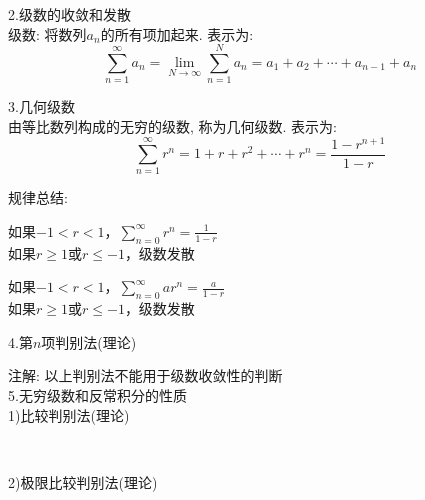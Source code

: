 2.级数的收敛和发散\\
级数: 将数列${a_n}$的所有项加起来. 表示为:
\[\sum_{n=1}^{\infty}a_n=\lim_{N\to\infty}\sum_{n=1}^Na_n=a_1+a_2+\cdots+a_{n-1}+a_n\]\vspace{4ex}

3.几何级数\\
由等比数列构成的无穷的级数, 称为几何级数. 表示为:
\[\sum_{n=1}^{\infty}r^n=1+r+r^2+\cdots+r^n=\frac{1-r^{n+1}}{1-r}\]

规律总结:
\begin{center}
\begin{boxedminipage}{6cm}
如果$-1<r<1$，$\displaystyle\sum_{n=0}^{\infty}r^n=\frac{1}{1-r}$\\
如果$r\geqslant 1$或$r\leqslant -1$，级数发散
\end{boxedminipage}
\end{center}\vspace{4ex}

\begin{center}
\begin{boxedminipage}{6cm}
如果$-1<r<1$，$\displaystyle\sum_{n=0}^{\infty}ar^n=\frac{a}{1-r}$\\
如果$r\geqslant 1$或$r\leqslant -1$，级数发散
\end{boxedminipage}
\end{center}\vspace{6ex}

4.第$n$项判别法(理论)
{\par\centering
{}
\par}
注解: 以上判别法不能用于级数收敛性的判断\\[4ex]

5.无穷级数和反常积分的性质\\
1)比较判别法(理论)
{\par\centering
{}\\[2ex]
\par}\vspace{4ex}

2)极限比较判别法(理论)
{\par\centering
{}
\par}\vspace{4ex}

